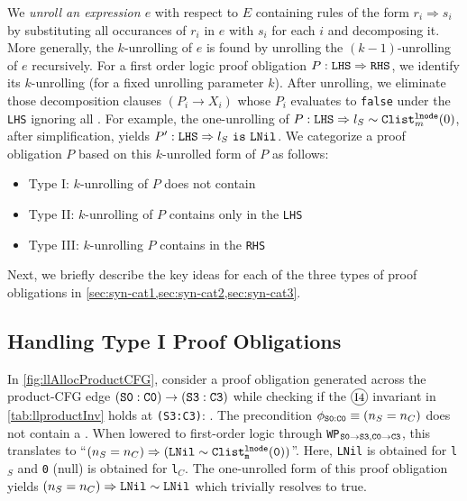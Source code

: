 We {\em unroll an expression $e$} with respect to $E$ containing rules of the form $r_i \Rightarrow s_i$ by substituting
all occurances of $r_i$ in $e$ with $s_i$ for each $i$ and decomposing it. More generally, the $k$-unrolling of $e$ is found
by unrolling the $(k-1)$-unrolling of $e$ recursively. For a first order logic proof obligation $P:{\tt LHS}\Rightarrow{\tt RHS}$,
we identify its $k$-unrolling (for a fixed unrolling parameter $k$). After unrolling, we eliminate those
decomposition clauses $(P_i \rightarrow X_i)$ whose $P_i$ evaluates to {\tt false} under the {\tt LHS} ignoring all \recursiveRelations{}.
For example, the one-unrolling of $P:{\tt LHS} \Rightarrow l_S \sim{} {\tt Clist}_m^{\tt lnode}(0)$, after simplification, yields
$P': {\tt LHS} \Rightarrow l_S\ {\tt is}\ {\tt LNil}$. We categorize a proof obligation $P$ based on this $k$-unrolled form of $P$ as follows:
\vspace{-10px}
\begin{itemize}
\setlength{\itemsep}{0px}
\item Type I: $k$-unrolling of $P$ does not contain \recursiveRelations{}
\item Type II: $k$-unrolling of $P$ contains \recursiveRelations{} only in the {\tt LHS}
\item Type III: $k$-unrolling $P$ contains \recursiveRelations{} in the {\tt RHS}
\end{itemize}
\vspace{-10px}
Next, we briefly describe the key ideas for each of the three types of proof obligations in \cref{sec:syn-cat1,sec:syn-cat2,sec:syn-cat3}.


\vspace{-10px}
\subsection{Handling Type I Proof Obligations}
\label{sec:syn-cat1}
In \cref{fig:llAllocProductCFG}, consider a proof obligation generated
across the product-CFG edge ${\tt (S0:C0) \rightarrow (S3:C3)}$
while checking if the ${\small \circled{I4}}$ invariant in \cref{tab:llproductInv}
holds at {\tt (S3:C3)}:
.
The precondition $\phi_{{\tt S0:C0}}\equiv(n_S=n_C)$ does not contain
a \recursiveRelation{}.
When lowered to first-order logic through {\tt WP$_{{\tt S0\rightarrow S3},{\tt C0\rightarrow C3}}$}, this translates to
``$(n_S=n_C)\Rightarrow({\tt LNil}\sim{}{\tt Clist^{{\tt lnode}}_{m}(0)})$''.
Here, {\tt LNil} is obtained for {\tt l$_{S}$} and {\tt 0} (null) is
obtained for {\tt l$_C$}.
The one-unrolled form of this proof obligation yields
$(n_S=n_C)\Rightarrow{}{\tt LNil}\sim{}{\tt LNil}$ which trivially resolves to true.

